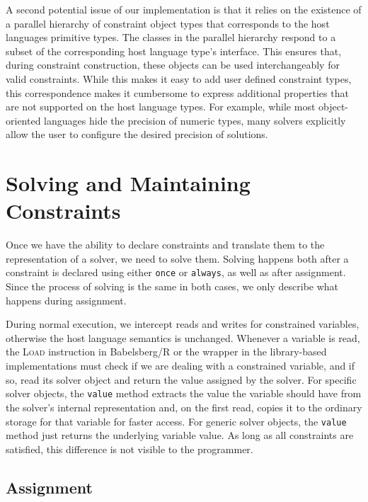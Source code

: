 A second potential issue of our implementation is that it relies on the
existence of a parallel hierarchy of constraint object types that corresponds to
the host languages primitive types. The classes in the parallel hierarchy
respond to a subset of the corresponding host language type's interface. This
ensures that, during constraint construction, these objects can be used
interchangeably for valid constraints. While this makes it easy to add user
defined constraint types, this correspondence makes it cumbersome to express
additional properties that are not supported on the host language types. For
example, while most object-oriented languages hide the precision of numeric
types, many solvers explicitly allow the user to configure the desired precision
of solutions.

\chapter{Solving and Maintaining Constraints}
\label{cha:solv-maint-constr}

Once we have the ability to declare constraints and translate them to the
representation of a solver, we need to solve them. Solving happens both after a
constraint is declared using either \lstinline{once} or \lstinline{always}, as
well as after assignment. Since the process of solving is the same in both
cases, we only describe what happens during assignment.

During normal execution, we intercept reads and writes for constrained
variables, otherwise the host language semantics is unchanged. Whenever a
variable is read, the \textsc{Load} instruction in Babelsberg/R or the wrapper
in the library-based implementations must check if we are dealing with a
constrained variable, and if so, read its solver object and return the value
assigned by the solver. For specific solver objects, the \lstinline{value}
method extracts the value the variable should have from the solver's internal
representation and, on the first read, copies it to the ordinary storage for
that variable for faster access. For generic solver objects, the
\lstinline{value} method just returns the underlying variable value. As long as
all constraints are satisfied, this difference is not visible to the programmer.

\section{Assignment}
\label{sec:assignment-1}

